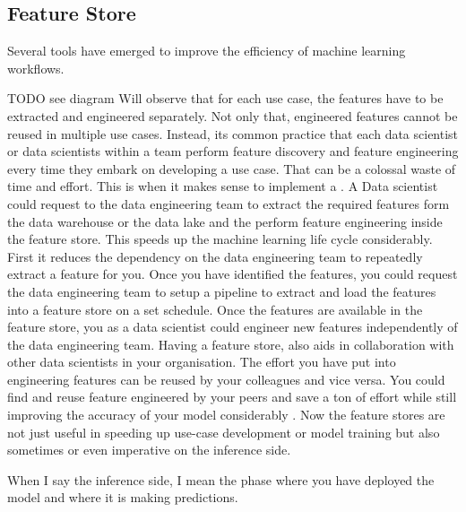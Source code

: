 
\subsection{Feature Store}
Several tools have emerged to improve the efficiency of machine learning workflows.

TODO see diagram
Will observe that for each use case, the features have to be extracted and engineered separately.
Not only that, engineered features cannot be reused in multiple use cases.
Instead, its common practice that each data scientist or data scientists within a team perform feature discovery and feature engineering every time they embark on developing a use case.
That can be a colossal waste of time and effort.
This is when it makes sense to implement a .
A Data scientist could request to the data engineering team to extract the required features form the data warehouse or the data lake and the perform feature engineering inside the feature store.
This speeds up the machine learning life cycle considerably.
First it reduces the dependency on the data engineering team to repeatedly extract a feature for you.
Once you have identified the features, you could request the data engineering team to setup a pipeline to extract and load the features into a feature store on a set schedule.
Once the features are available in the feature store, you as a data scientist could engineer new features independently of the data engineering team.
Having a feature store, also aids in collaboration with other data scientists in your organisation.
The effort you have put into engineering features can be reused by your colleagues and vice versa.
You could find and reuse feature engineered by your peers and save a ton of effort while still improving the accuracy of your model considerably .
Now the feature stores are not just useful in speeding up use-case development or model training but also sometimes or even imperative on the inference side.

When I say the inference side, I mean the phase where you have deployed the model and where it is making predictions.


